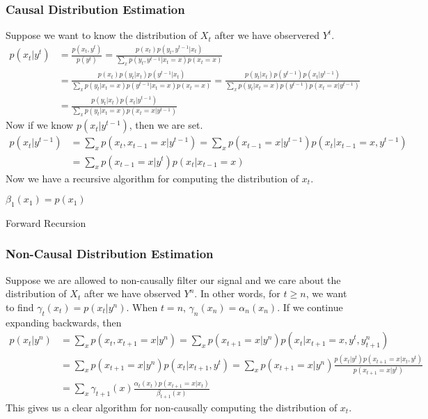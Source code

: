 \subsubsection{Causal Distribution Estimation}
Suppose we want to know the distribution of $X_t$ after we have observered $Y^t$.
\begin{align*}
	p(x_t|y^t) &= \frac{p(x_t,y^t)}{p(y^t)} = \frac{p(x_t)p(y_t, y^{t-1}|x_t)}{\sum_{x}p(y_t,y^{t-1}|x_t=x)p(x_t=x)}\\
	&= \frac{p(x_t)p(y_t|x_t)p(y^{t-1}|x_t)}{\sum_xp(y_t|x_t=x)p(y^{t-1}|x_t=x)p(x_t=x)} = \frac{p(y_t|x_t)p(y^{t-1})p(x_t|y^{t-1})}{\sum_{x}p(y_t|x_t=x)p(y^{t-1})p(x_t=x|y^{t-1})}\\
	&=\frac{p(y_t|x_t)p(x_t|y^{t-1})}{\sum_{x}p(y_t|x_t=x)p(x_t=x|y^{t-1})}
\end{align*}
Now if we know $p(x_t|y^{t-1})$, then we are set.
\begin{align*}
	p(x_t|y^{t-1}) &= \sum_xp(x_t,x_{t-1}=x|y^{t-1}) = \sum_x p(x_{t-1}=x|y^{t-1})p(x_t|x_{t-1}=x,y^{t-1}) \\
	&= \sum_x p(x_{t-1}=x|y^t)p(x_t|x_{t-1}=x)
\end{align*}
Now we have a recursive algorithm for computing the distribution of $x_t$.

\begin{gitbook-image}
\begin{algorithm}[H]
	\SetAlgoLined
	$\beta_1(x_1) = p(x_1)$\;
	\caption{Forward Recursion}
\end{algorithm}
\end{gitbook-image}
\subsubsection{Non-Causal Distribution Estimation}
Suppose we are allowed to non-causally filter our signal and we care about the distribution of $X_t$ after we have observed $Y^n$.
In other words, for $t \geq n$, we want to find $\gamma_t(x_t) = p(x_t|y^n)$.
When $t=n$, $\gamma_n(x_n) = \alpha_n(x_n)$.
If we continue expanding backwards, then
\begin{align*}
	p(x_t|y^n) &= \sum_x p(x_t,x_{t+1}=x|y^n) = \sum_x p(x_{t+1}=x|y^n)p(x_t|x_{t+1}=x,y^t,y_{t+1}^n)\\
	&= \sum_x p(x_{t+1}=x|y^n)p(x_t|x_{t+1},y^t) = \sum_x p(x_{t+1}=x|y^n)\frac{p(x_t|y^t)p(x_{t+1}=x|x_t,y^t)}{p(x_{t+1}=x|y^t)}\\
	&= \sum_x \gamma_{t+1}(x)\frac{\alpha_t(x_t)p(x_{t+1}=x|x_t)}{\beta_{t+1}(x)}
\end{align*}
This gives us a clear algorithm for non-causally computing the distribution of $x_t$.


